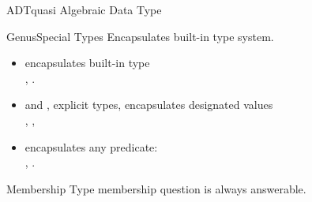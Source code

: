 \newsavebox\adtbox
\begin{lrbox}{\adtbox}
  \begin{minipage}{11cm}
    
  \end{minipage}
\end{lrbox}



\begin{frame}{ADT}{quasi Algebraic Data Type}

  \usebox\adtbox

\end{frame}

\begin{frame}{Genus}{Special Types}
  Encapsulates built-in type system.

  \bigskip
  
  \begin{itemize}
  \item {} encapsulates built-in type \\
    \eg, .
  \item {} and , explicit types, encapsulates designated values\\
    \eg, , 
  \item {} encapsulates any predicate: \\
    \eg, .
  \end{itemize}
\end{frame}


\newsavebox\membershipbox
\begin{lrbox}{\membershipbox}
  \begin{minipage}{11cm}
    
  \end{minipage}
\end{lrbox}

\begin{frame}{Membership}
  Type membership question is always answerable.

  \usebox\membershipbox
\end{frame}

\newsavebox\subtypebox
\begin{lrbox}{\subtypebox}
  \begin{minipage}{11cm}

  \end{minipage}
\end{lrbox}



